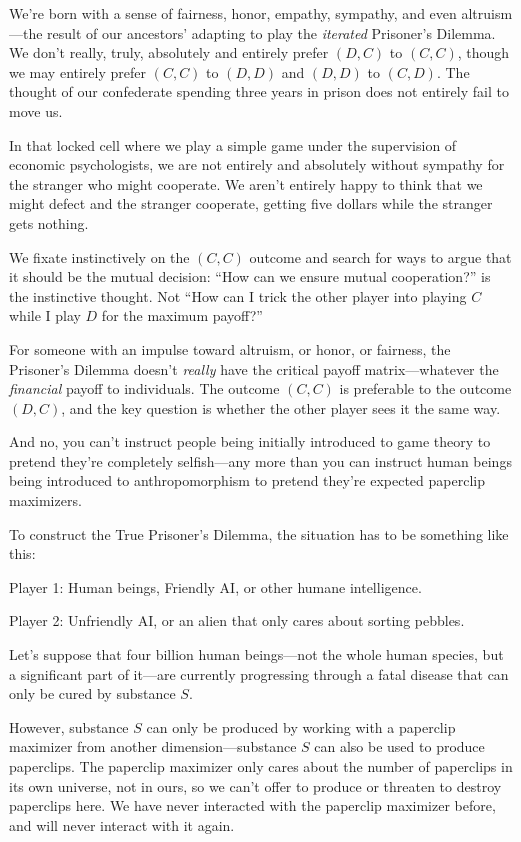 {
 We're born with a sense of fairness, honor,
empathy, sympathy, and even altruism---the result of our
ancestors' adapting to play the \textit{iterated}
Prisoner's Dilemma. We don't really,
truly, absolutely and entirely prefer $(D,C)$ to $(C,C)$, though we may
entirely prefer $(C,C)$ to $(D,D)$ and $(D,D)$ to $(C,D)$. The thought of our
confederate spending three years in prison does not entirely fail to
move us.}

{
 In that locked cell where we play a simple game under the
supervision of economic psychologists, we are not entirely and
absolutely without sympathy for the stranger who might cooperate. We
aren't entirely happy to think that we might defect and
the stranger cooperate, getting five dollars while the stranger gets
nothing.}

{
 We fixate instinctively on the $(C,C)$ outcome and search for ways
to argue that it should be the mutual decision: ``How
can we ensure mutual cooperation?'' is the
instinctive thought. Not ``How can I trick the other
player into playing $C$ while I play $D$ for the maximum
payoff?''}

{
 For someone with an impulse toward altruism, or honor, or
fairness, the Prisoner's Dilemma
doesn't \textit{really} have the critical payoff
matrix---whatever the \textit{financial} payoff to individuals. The
outcome $(C,C)$ is preferable to the outcome $(D,C)$, and the key question
is whether the other player sees it the same way.}

{
 And no, you can't instruct people being initially
introduced to game theory to pretend they're completely
selfish---any more than you can instruct human beings being introduced
to anthropomorphism to pretend they're expected
paperclip maximizers.}

{
 To construct the True Prisoner's Dilemma, the
situation has to be something like this:}

{
 Player 1: Human beings, Friendly AI, or other humane
intelligence.}

{
 Player 2: Unfriendly AI, or an alien that only cares about sorting
pebbles.}

{
 Let's suppose that four billion human beings---not
the whole human species, but a significant part of it---are currently
progressing through a fatal disease that can only be cured by substance
$S$.}

{
 However, substance $S$ can only be produced by working with a
paperclip maximizer from another dimension---substance $S$ can also be
used to produce paperclips. The paperclip maximizer only cares about
the number of paperclips in its own universe, not in ours, so we
can't offer to produce or threaten to destroy
paperclips here. We have never interacted with the paperclip maximizer
before, and will never interact with it again.}

